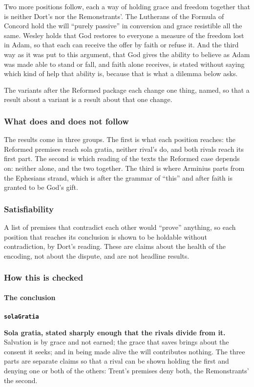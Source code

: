 \documentclass[11pt]{article}
\begin{document}
Two more positions follow, each a way of holding grace and freedom together that is neither Dort’s nor the Remonstrants’. The Lutherans of the Formula of Concord hold the will “purely passive” in conversion and grace resistible all the same. Wesley holds that God restores to everyone a measure of the freedom lost in Adam, so that each can receive the offer by faith or refuse it. And the third way as it was put to this argument, that God gives the ability to believe as Adam was made able to stand or fall, and faith alone receives, is stated without saying which kind of help that ability is, because that is what a dilemma below asks.

The variants after the Reformed package each change one thing, named, so that a result about a variant is a result about that one change.

\subsubsection*{What does and does not follow}
The results come in three groups. The first is what each position reaches: the Reformed premises reach sola gratia, neither rival’s do, and both rivals reach its first part. The second is which reading of the texts the Reformed case depends on: neither alone, and the two together. The third is where Arminius parts from the Ephesians strand, which is after the grammar of “this” and after faith is granted to be God’s gift.

\subsubsection*{Satisfiability}
A list of premises that contradict each other would “prove” anything, so each position that reaches its conclusion is shown to be holdable without contradiction, by Dort’s reading. These are claims about the health of the encoding, not about the dispute, and are not headline results.

\subsubsection*{How this is checked}
\paragraph*{The conclusion}
\leavevmode\par\nobreak
\par\medskip\noindent\textbf{\texttt{sola\allowbreak{}Gratia}}\par\nobreak\noindent
\textbf{Sola gratia, stated sharply enough that the rivals divide from it.} Salvation is by grace and not earned; the grace that saves brings about the consent it seeks; and in being made alive the will contributes nothing. The three parts are separate claims so that a rival can be shown holding the first and denying one or both of the others: Trent’s premises deny both, the Remonstrants’ the second.
\end{document}

